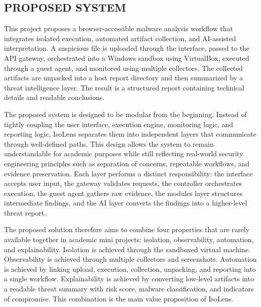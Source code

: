 \documentclass[a4paper,12pt,oneside]{report}
\begin{document}
\subsection{PROPOSED SYSTEM}
This project proposes a browser-accessible malware analysis workflow that integrates isolated execution, automated artifact collection, and AI-assisted interpretation. A suspicious file is uploaded through the interface, passed to the API gateway, orchestrated into a Windows sandbox using VirtualBox, executed through a guest agent, and monitored using multiple collectors. The collected artifacts are unpacked into a host report directory and then summarized by a threat intelligence layer. The result is a structured report containing technical details and readable conclusions.

\par

\par

The proposed system is designed to be modular from the beginning. Instead of tightly coupling the user interface, execution engine, monitoring logic, and reporting logic, IsoLens separates them into independent layers that communicate through well-defined paths. This design allows the system to remain understandable for academic purposes while still reflecting real-world security engineering principles such as separation of concerns, repeatable workflows, and evidence preservation. Each layer performs a distinct responsibility: the interface accepts user input, the gateway validates requests, the controller orchestrates execution, the guest agent gathers raw evidence, the modules layer structures intermediate findings, and the AI layer converts the findings into a higher-level threat report.

\par

\par

The proposed solution therefore aims to combine four properties that are rarely available together in academic mini projects: isolation, observability, automation, and explainability. Isolation is achieved through the sandboxed virtual machine. Observability is achieved through multiple collectors and screenshots. Automation is achieved by linking upload, execution, collection, unpacking, and reporting into a single workflow. Explainability is achieved by converting low-level artifacts into a readable threat summary with risk score, malware classification, and indicators of compromise. This combination is the main value proposition of IsoLens.
\end{document}

